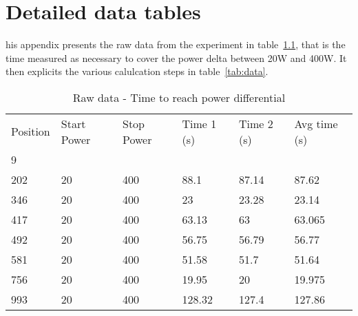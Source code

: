 \chapter{Detailed data tables}
\label{app:app02}

his appendix presents the raw data from the experiment in table~\ref{tab:time_rawdata}, that is the time measured as necessary to cover the power delta between 20W and 400W. It then explicits the various calulcation steps in table~\ref{tab:data}.

\begin{table}[!htb]
    \centering
\begin{tabular}{llllll}
Position & Start Power & Stop Power & Time 1 (s) & Time 2 (s) & Avg time (s) \\
9        &             &            &            &            &              \\
202      & 20          & 400        & 88.1       & 87.14      & 87.62        \\
346      & 20          & 400        & 23         & 23.28      & 23.14        \\
417      & 20          & 400        & 63.13      & 63         & 63.065       \\
492      & 20          & 400        & 56.75      & 56.79      & 56.77        \\
581      & 20          & 400        & 51.58      & 51.7       & 51.64        \\
756      & 20          & 400        & 19.95      & 20         & 19.975       \\
993      & 20          & 400        & 128.32     & 127.4      & 127.86      
\end{tabular}
        \caption{Raw data - Time to reach power differential}\label{tab:time_rawdata}
\end{table}


